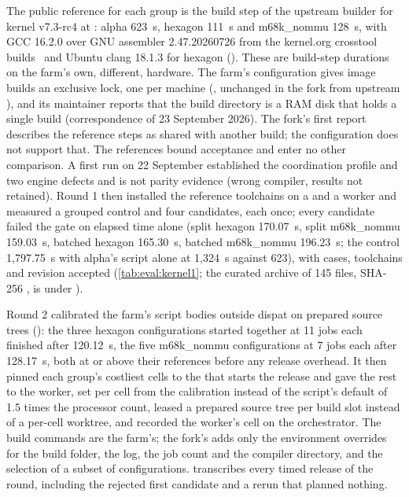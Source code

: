 The public reference for each group is the build step of the upstream builder
for kernel v7.3-rc4 at :
alpha 623~s, hexagon 111~s and m68k\_nommu 128~s, with GCC 16.2.0 over GNU
assembler 2.47.20260726 from the kernel.org crosstool
builds~\cite{crosstool} and Ubuntu clang 18.1.3 for hexagon
(). These are
build-step durations on the farm's own, different, hardware. The farm's
configuration gives image builds an exclusive lock, one per machine
(, unchanged in the fork from upstream
), and its maintainer reports that the build directory is a RAM
disk that holds a single build (correspondence of 23 September 2026). The
fork's first report describes the reference steps as shared with another
build; the configuration does not support that. The references bound
acceptance and enter no other comparison. A first run on 22 September established the coordination profile
and two engine defects and is not parity evidence (wrong compiler, results
not retained). Round 1 then installed the reference toolchains on a
 and a  worker and measured a
grouped control and four candidates, each once; every candidate failed the
gate on elapsed time alone (split hexagon 170.07~s, split m68k\_nommu
159.03~s, batched hexagon 165.30~s, batched m68k\_nommu 196.23~s; the control
1,797.75~s with alpha's script alone at 1,324~s against 623), with cases,
toolchains and revision accepted (\cref{tab:eval:kernel1}; the curated archive
of 145 files, SHA-256 , is under
).

Round 2 calibrated the farm's script bodies outside dispat on prepared source
trees (): the three hexagon
configurations started together at 11 jobs each finished after 120.12~s, the
five m68k\_nommu configurations at 7 jobs each after 128.17~s, both at or above
their references before any release overhead. It then pinned each group's
costliest cells to the  that starts the release and gave
the rest to the  worker, set  per cell from the calibration instead of the
script's default of 1.5 times the processor count, leased a prepared source
tree per build slot instead of a per-cell worktree, and recorded the worker's
cell on the orchestrator. The build commands are the farm's; the fork's
 adds only the environment overrides for the build
folder, the log, the job count and the compiler directory, and the selection
of a subset of configurations.  transcribes every timed release
of the round, including the rejected first candidate and a rerun that planned
nothing.

